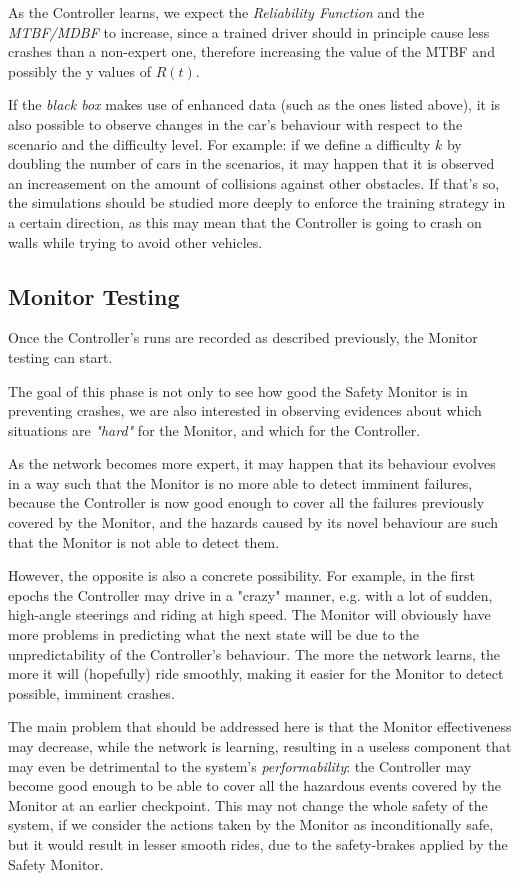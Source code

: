 As the Controller learns, we expect the \textsl{Reliability Function} and the \textsl{MTBF/MDBF} to increase, since a trained driver should in principle cause less crashes than a non-expert one, therefore increasing the value of the MTBF and possibly the y values of $R(t)$.

If the \textsl{black box} makes use of enhanced data (such as the ones listed above), it is also possible to observe changes in the car's behaviour with respect to the scenario and the difficulty level. For example: if we define a difficulty $k$ by doubling the number of cars in the scenarios, it may happen that it is observed an increasement on the amount of collisions against other obstacles. If that's so, the simulations should be studied more deeply to enforce the training strategy in a certain direction, as this may mean that the Controller is going to crash on walls while trying to avoid other vehicles.


\subsection{Monitor Testing}

Once the Controller's runs are recorded as described previously, the Monitor testing can start.

The goal of this phase is not only to see how good the Safety Monitor is in preventing crashes, we are also interested in observing evidences about which situations are \textsl{"hard"} for the Monitor, and which for the Controller. 

As the network becomes more expert, it may happen that its behaviour evolves in a way such that the Monitor is no more able to detect imminent failures, because the Controller is now good enough to cover all the failures previously covered by the Monitor, and the hazards caused by its novel behaviour are such that the Monitor is not able to detect them.

However, the opposite is also a concrete possibility. For example, in the first epochs the Controller may drive in a "crazy" manner, e.g. with a lot of sudden, high-angle steerings and riding at high speed. The Monitor will obviously have more problems in predicting what the next state will be due to the unpredictability of the Controller's behaviour. The more the network learns, the more it will (hopefully) ride smoothly, making it easier for the Monitor to detect possible, imminent crashes.

The main problem that should be addressed here is that the Monitor effectiveness may decrease, while the network is learning, resulting in a useless component that may even be detrimental to the system's \textsl{performability}: the Controller may become good enough to be able to cover all the hazardous events covered by the Monitor at an earlier checkpoint. This may not change the whole safety of the system, if we consider the actions taken by the Monitor as inconditionally safe, but it would result in lesser smooth rides, due to the safety-brakes applied by the Safety Monitor.

